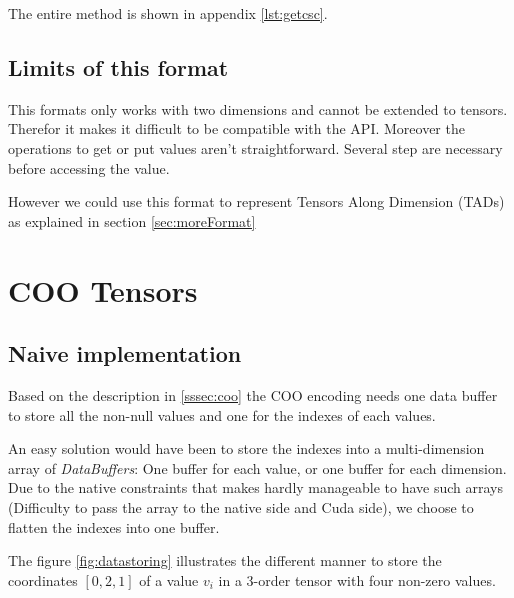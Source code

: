 The entire method is shown in appendix \ref{lst:getcsc}.

\subsection{Limits of this format}

This formats only works with two dimensions and cannot be extended to tensors. Therefor it makes it difficult to be compatible with the API.
Moreover the operations to get or put values aren't straightforward. Several step are necessary before accessing the value.

However we could use this format to represent Tensors Along Dimension (TADs) as explained in section \ref{sec:moreFormat}

\section{COO Tensors}
\subsection{Naive implementation} \label{ssec:naiveCoo}

Based on the description in \ref{sssec:coo} the COO encoding needs one data buffer to store all the non-null values and one for the indexes of each values. 

An easy solution would have been to store the indexes into a multi-dimension array of \textit{DataBuffers}: One buffer for each value, or one buffer for each dimension. Due to the native constraints that makes hardly manageable to have such arrays (Difficulty to pass the array to the native side and Cuda side), we choose to flatten the indexes into one buffer.

The figure \ref{fig:datastoring} illustrates the different manner to store the coordinates $[0, 2, 1]$ of a value $v_{i}$ in a 3-order tensor with four non-zero values.

